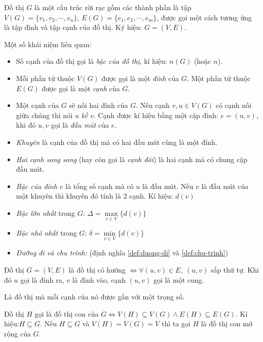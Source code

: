 
\begin{definition}
	Đồ thị $G$ là một cấu trúc rời rạc gồm các thành phần là tập ${V(G) = \{v_1,v_2,\cdots,v_n\}}$, $E(G) = \{e_1,e_2,\cdots,e_m\}$, được gọi một cách tương ứng là tập đỉnh và tập cạnh của đồ thị. Ký hiệu: $G = (V, E)$.
\end{definition}
Một số khái niệm liên quan:
\begin{itemize}
	\item Số cạnh của đồ thị gọi là \textit{bậc của đồ thị}, kí hiệu: $n(G)$ (hoặc $n$).
	\item Mỗi phần tử thuộc $V(G)$ được gọi là một \textit{đỉnh} của $G$. Một phần tử thuộc $E(G)$ được gọi là một \textit{cạnh} của $G$.
	\item Một cạnh của $G$ sẽ nối hai đỉnh của $G$. Nếu cạnh $v,u \in V(G)$ có cạnh nối giữa chúng thì nói $u$ \textit{kề} $v$. Cạnh được kí hiệu bằng một cặp đỉnh: $e = (u,v)$, khi đó $u,v$ gọi là \textit{đầu mút} của $e$.
	\item \textit{Khuyên} là cạnh của đồ thị mà có hai đầu mút cùng là một đỉnh.
	\item \textit{Hai cạnh song song} (hay còn gọi là \textit{cạnh đôi}) là hai cạnh mà có chung cặp đầu mút.
	\item \textit{Bậc của đỉnh} $v$ là tổng số cạnh mà có $u$ là đầu mút. Nếu $v$ là đầu mút của một khuyên thì khuyên đó tính là 2 cạnh. Kí hiệu: $d(v)$
	\item \textit{Bậc lớn nhất} trong $G$: $\Delta = \max\limits_{v\in V} \{d(v)\}$
	\item \textit{Bậc nhỏ nhất} trong $G$: $\delta = \min\limits_{v\in V} \{d(v)\}$
	\item \textit{Đường đi và chu trình:} (định nghĩa \ref{def:duong-di} và \ref{def:chu-trinh})
\end{itemize}


\begin{definition}
	Đồ thị $G=(V,E)$ là đồ thị có hướng $\iff \forall (u,v)\in E,\ (u,v)$ sắp thứ tự. Khi đó $u$ gọi là đỉnh ra, $v$ là đỉnh vào, cạnh $(u,v)$ gọi là một cung.
\end{definition}


\begin{definition}
	 Là đồ thị mà mỗi cạnh của nó được gắn với một trọng số.
\end{definition}
\begin{definition}
	 Đồ thị $H$ gọi là đồ thị con của $G \iff V(H) \subseteq V(G) \land E(H) \subseteq E(G)$. Kí hiệu:$H \subseteq G$. Nếu $H \subseteq G$ và $V(H) = V(G) = V$ thì ta gọi $H$ là đồ thị con mở rộng của $G$.
\end{definition}

